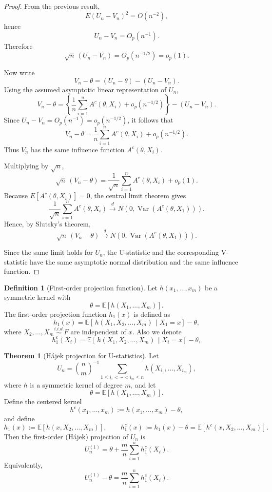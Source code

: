 \documentclass[11pt]{article}
\theoremstyle{definition}
\newtheorem{defn}{Definition}[section]
\newtheorem{theo}{Theorem}[section]
\begin{document}
\begin{proof}
From the previous result,
\[
E(U_n-V_n)^2=O(n^{-2}),
\]
hence
\[
U_n-V_n=O_p(n^{-1}).
\]
Therefore
\[
\sqrt n\,(U_n-V_n)=O_p(n^{-1/2})=o_p(1).
\]

Now write
\[
V_n-\theta
=
(U_n-\theta)-(U_n-V_n).
\]
Using the assumed asymptotic linear representation of \(U_n\),
\[
V_n-\theta
=
\left\{\frac1n\sum_{i=1}^n A^c(\theta,X_i)+o_p(n^{-1/2})\right\}
-
(U_n-V_n).
\]
Since \(U_n-V_n=O_p(n^{-1})=o_p(n^{-1/2})\), it follows that
\[
V_n-\theta
=
\frac1n\sum_{i=1}^n A^c(\theta,X_i)+o_p(n^{-1/2}).
\]
Thus \(V_n\) has the same influence function \(A^c(\theta,X_i)\).

Multiplying by \(\sqrt n\),
\[
\sqrt n\,(V_n-\theta)
=
\frac1{\sqrt n}\sum_{i=1}^n A^c(\theta,X_i)+o_p(1).
\]
Because \(E[A^c(\theta,X_i)]=0\), the central limit theorem gives
\[
\frac1{\sqrt n}\sum_{i=1}^n A^c(\theta,X_i)
\xrightarrow{d}
N\!\left(0,\operatorname{Var}(A^c(\theta,X_1))\right).
\]
Hence, by Slutsky's theorem,
\[
\sqrt n\,(V_n-\theta)\xrightarrow{d}N\!\left(0,\operatorname{Var}(A^c(\theta,X_1))\right).
\]

Since the same limit holds for \(U_n\), the U-statistic and the corresponding V-statistic have the same asymptotic normal distribution and the same influence function.
\end{proof}

\begin{defn}[First-order projection function]
Let $h(x_1,\dots,x_m)$ be a symmetric kernel with
\[
\theta = \mathbb{E}[h(X_1,\dots,X_m)].
\]
The first-order projection function $h_1(x)$ is defined as
\[
h_1(x)
=
\mathbb{E}[\,h(X_1, X_2,\dots,X_m)\,\mid X_1 = x] - \theta,
\]
where $X_2,\dots,X_m \overset{i.i.d.}{\sim} F$ are independent of $x$. Also we denote
\[
h_1^c(X_i)
=
\mathbb{E}[\,h(X_1, X_2,\dots,X_m)\,\mid X_i = x] - \theta,
\]
\end{defn}

\begin{theo}[Hájek projection for U-statistics]
Let
\[
U_n
=
\binom{n}{m}^{-1}
\sum_{1 \le i_1 < \cdots < i_m \le n}
h(X_{i_1},\dots,X_{i_m}),
\]
where $h$ is a symmetric kernel of degree $m$, and let
\[
\theta = \mathbb{E}[h(X_1,\dots,X_m)].
\]
Define the centered kernel
\[
h^c(x_1,\dots,x_m) := h(x_1,\dots,x_m)-\theta,
\]
and define
\[
h_1(x):=\mathbb{E}[h(x,X_2,\dots,X_m)],
\qquad
h_1^c(x):=h_1(x)-\theta
=\mathbb{E}[h^c(x,X_2,\dots,X_m)].
\]
Then the first-order (Hájek) projection of $U_n$ is
\[
U_n^{(1)}
=
\theta+\frac{m}{n}\sum_{i=1}^n h_1^c(X_i).
\]
Equivalently,
\[
U_n^{(1)}-\theta
=
\frac{m}{n}\sum_{i=1}^n h_1^c(X_i).
\]
\end{theo}
\end{document}
